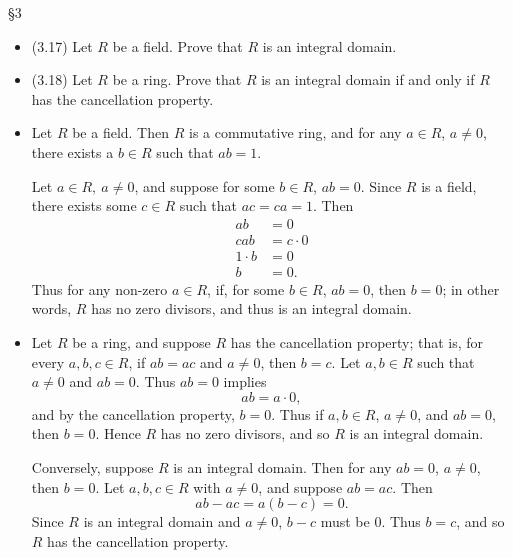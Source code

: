 \documentclass{homework}
\begin{document}
\begin{problem}{\S 3}
  \begin{itemize}
    \item (3.17) Let $R$ be a field. Prove that $R$ is an integral domain.
    \item (3.18) Let $R$ be a ring. Prove that $R$ is an integral domain if and only if $R$ has
      the cancellation property.
  \end{itemize}
\end{problem}

\begin{solution}
  \begin{itemize}
    \item Let $R$ be a field. Then $R$ is a commutative ring, and for any $a\in R$, $a\neq 0$,
      there exists a $b\in R$ such that $ab=1$.

      Let $a\in R,\ a\neq 0$, and suppose for some $b\in R$, $ab=0$. Since $R$ is a field, there
      exists some $c\in R$ such that $ac=ca=1$. Then
      \begin{align*}
        ab&= 0 \\
        cab&= c\cdot 0 \\
        1\cdot b&=0\\
        b&=0
      .\end{align*} Thus for any non-zero $a\in R$, if, for some $b\in R$, $ab=0$, then $b=0$; in
      other words, $R$ has no zero divisors, and thus is an integral domain.

    \item Let $R$ be a ring, and suppose $R$ has the cancellation property; that is, for every
      $a,b,c\in R$, if $ab=ac$ and $a\neq 0$, then $b=c$. Let $a,b\in R$ such that $a\neq 0$ and
      $ab=0$. Thus $ab=0$ implies \[
        ab=a\cdot 0
      ,\] and by the cancellation property, $b=0$. Thus if $a,b\in R$, $a\neq 0$, and $ab=0$,  then
      $b=0$. Hence $R$ has no zero divisors, and so $R$ is an integral domain.

      Conversely, suppose $R$ is an integral domain. Then for any $ab=0$, $a\neq 0$, then $b=0$.
      Let $a,b,c\in R$ with $a\neq 0$, and suppose $ab=ac$. Then \[
        ab-ac=a(b-c)=0
      .\] Since $R$ is an integral domain and $a\neq 0$, $b-c$ must be $0$. Thus $b=c$, and so
      $R$ has the cancellation property.
  \end{itemize}
\end{solution}
\end{document}

